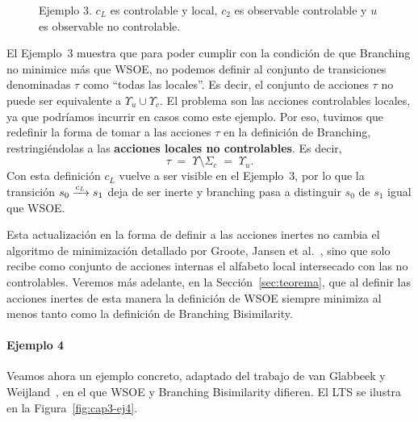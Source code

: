 \begin{figure}[htbp]
  \centering
  \caption{Ejemplo 3. $c_L$ es controlable y local, $c_2$ es observable controlable y $u$ es observable no controlable.}
  \label{fig:cap3-ej3}
\end{figure}

El Ejemplo~3 muestra que para poder cumplir con la condición de que Branching no minimice más que WSOE, no podemos definir al conjunto de transiciones denominadas $\tau$ como ``todas las locales''. Es decir, el conjunto de acciones $\tau$ no puede ser equivalente a $\Upsilon_u \cup \Upsilon_c$. El problema son las acciones controlables locales, ya que podríamos incurrir en casos como este ejemplo. Por eso, tuvimos que redefinir la forma de tomar a las acciones $\tau$ en la definición de Branching, restringiéndolas a las \textbf{acciones locales no controlables}. Es decir,
\[
\tau \;=\;  \Upsilon \setminus \Sigma_c \;=\; \Upsilon_u.
\]
Con esta definición $c_L$ vuelve a ser visible en el Ejemplo~3, por lo que la transición $s_0 \pijl{c_L} s_1$ deja de ser inerte y branching pasa a distinguir $s_0$ de $s_1$ igual que WSOE.

Esta actualización en la forma de definir a las acciones inertes no cambia el algoritmo de minimización detallado por Groote, Jansen et al.~\cite{groote2019}, sino que solo recibe como conjunto de acciones internas el alfabeto local intersecado con las no controlables. Veremos más adelante, en la Sección~\ref{sec:teorema}, que al definir las acciones inertes de esta manera la definición de WSOE siempre minimiza al menos tanto como la definición de Branching Bisimilarity.

\paragraph{Ejemplo 4}
Veamos ahora un ejemplo concreto, adaptado del trabajo de van Glabbeek y Weijland~\cite{glabbeek1996}, en el que WSOE y Branching Bisimilarity difieren. El LTS se ilustra en la Figura~\ref{fig:cap3-ej4}.

